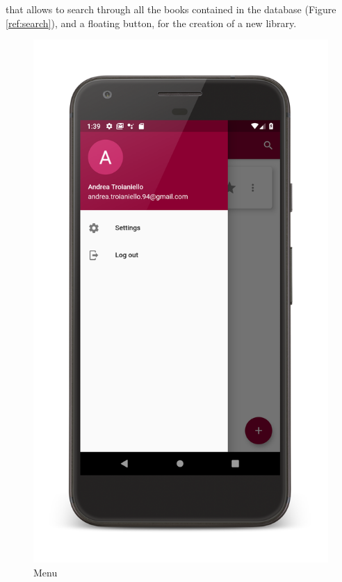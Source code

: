 that allows to search through all the books contained in the database (Figure \ref{ref:search}), 
and a floating button, for the creation of a new library.\\
\clearpage
\begin{figure}[!htb]
    \begin{minipage}[b]{0.3\textwidth}
        \centering
        \includegraphics[scale=0.09]{images/menu.png}
        \caption{Menu}
        \label{ref:menu}
    \end{minipage}

\end{figure}
